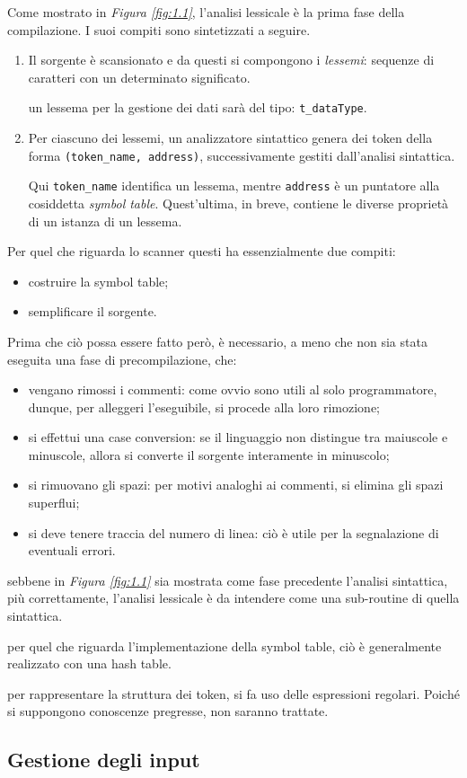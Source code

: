 \documentclass{subfiles}
\begin{document}
Come mostrato in \emph{Figura \ref{fig:1.1}}, l'analisi lessicale è la prima fase della compilazione.
I suoi compiti sono sintetizzati a seguire.
\begin{enumerate}
    \item Il sorgente è scansionato e da questi si compongono i \emph{lessemi}: sequenze di caratteri con un determinato significato.
          \begin{Example*}
              un lessema per la gestione dei dati sarà del tipo: \lstinline{t_dataType}.
          \end{Example*}

    \item Per ciascuno dei lessemi, un analizzatore sintattico genera dei token della forma \lstinline{(token_name, address)},
          successivamente gestiti dall'analisi sintattica.

          Qui \lstinline{token_name} identifica un lessema, mentre \lstinline{address} è un puntatore alla cosiddetta \emph{symbol table}.
          Quest'ultima, in breve, contiene le diverse proprietà di un istanza di un lessema.
\end{enumerate}

Per quel che riguarda lo scanner questi ha essenzialmente due compiti:
\begin{itemize}
    \item costruire la symbol table;
    \item semplificare il sorgente.
\end{itemize}

Prima che ciò possa essere fatto però, è necessario, a meno che non sia stata eseguita una fase di precompilazione, che:
\begin{itemize}
    \item vengano rimossi i commenti: come ovvio sono utili al solo programmatore, dunque, per alleggeri l'eseguibile, si procede alla loro rimozione;
    \item si effettui una case conversion: se il linguaggio non distingue tra maiuscole e minuscole, allora si converte il sorgente interamente in minuscolo;
    \item si rimuovano gli spazi: per motivi analoghi ai commenti, si elimina gli spazi superflui;
    \item si deve tenere traccia del numero di linea: ciò è utile per la segnalazione di eventuali errori.
\end{itemize}

\begin{Note*}
    sebbene in \emph{Figura \ref{fig:1.1}} sia mostrata come fase precedente l'analisi sintattica, più correttamente,
    l'analisi lessicale è da intendere come una sub-routine di quella sintattica.
\end{Note*}
\begin{Note*}
    per quel che riguarda l'implementazione della symbol table, ciò è generalmente realizzato con una hash table.
\end{Note*}
\begin{Note*}
    per rappresentare la struttura dei token, si fa uso delle espressioni regolari.
    Poiché si suppongono conoscenze pregresse, non saranno trattate.
\end{Note*}

\subsection{Gestione degli input}

\end{document}
